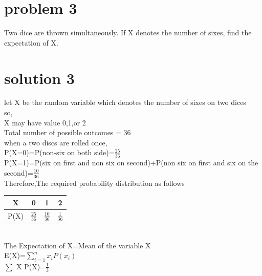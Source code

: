 \documentclass[journal,12pt,twocolumn]{article}
\begin{document}
 \section{problem 3}
 Two dice are thrown simultaneously. If X denotes the number of sixes, find the
expectation of X.

\section{solution 3}
let X be the random variable which denotes the number of sixes on two dices\\
so,\\
X may have value 0,1,or 2\\
Total number of possible outcomes = 36\\
when a  two discs are rolled once,\\
P(X=0)=P(non-six on both side)=$\frac{25}{36}$ \\
P(X=1)=P(six on first and non six on second)+P(non six on first and six on the second)=$\frac{10}{36}$\\

Therefore,The required probability distribution as follows\\


 \begin{tabular}{ |c |c |c |c |}
 \hline
 X  &  0  &  1  &  2\\
 \hline
 P(X)  &  $\frac{25}{36}$  &  $\frac{10}{36}$  &  $\frac{1}{36}$\\
 \hline
 \end{tabular}\\
 
 
 
 The Expectation of X=Mean of the variable X \\
 
 E(X)=$\sum_{i=1}^{n} x_i P(x_i)$\\
 

 $\sum$ X P(X)=$\frac{1}{3}$
 
\end{document}
